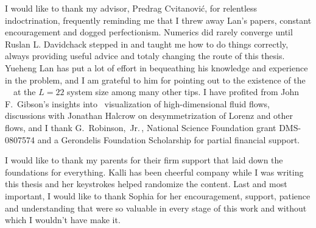 
I would like to thank my advisor, Predrag Cvitanovi\'c,
for 
	          {relentless indoctrination, frequently reminding me that
I threw away Lan's papers}, constant encouragement  and 
dogged perfectionism.
%
Numerics did rarely converge until Ruslan L. Davidchack stepped in
and taught me how to do things correctly, always providing
useful advice and totaly changing the route of this thesis.
Yueheng Lan has put a lot of effort in bequeathing his knowledge 
and experience in the problem, and I am grateful to him for pointing out to the
existence of the ~\eqv\ at the $L=22$ system size among many
other tips. I have
profited from John F.~Gibson's insights into \statesp\
visualization of high-dimensional fluid flows,
discussions with
Jonathan Halcrow on desymmetrization of Lorenz and other
flows, and
I thank
G.~Robinson,~Jr.\,, National Science Foundation grant
DMS-0807574 and a Gerondelis Foundation Scholarship
for partial financial support.

I would like to thank my parents for their firm support that 
laid down the foundations for everything. Kalli has been cheerful company while I was
writing this thesis and her keystrokes helped randomize the content.
%
Last and most important, I would like to thank Sophia for her encouragement, support, patience and
understanding that were so valuable in every stage of this work and without which I wouldn't
have make it.